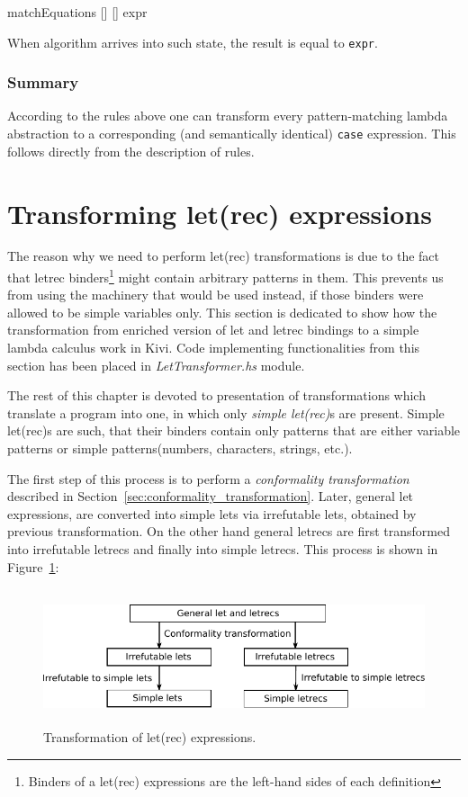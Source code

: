 \documentclass[12pt,a4paper]{report}
\begin{document}
\vspace*{0.2in}
\begin{code}[style=haskell]
matchEquations [] [] expr
\end{code}

When algorithm arrives into such state, the result is equal to \texttt{expr}.

\subsubsection{Summary}
According to the rules above one can transform every pattern-matching lambda
abstraction to a corresponding (and semantically identical) \texttt{case}
expression. This follows directly from the description of rules.

\section{Transforming let(rec) expressions}
\label{sec:letrec_transform}
The reason why we need to perform let(rec) transformations is due to the fact
that letrec binders\footnote{Binders of a let(rec) expressions are the
left-hand sides of each definition} might contain arbitrary patterns in them.
This prevents us from using the machinery that would be used instead, if those
binders were allowed to be simple variables only. This section is dedicated to
show how the transformation from enriched version of let and letrec bindings to
a simple lambda calculus work in Kivi. Code implementing functionalities from
this section has been placed in \textit{LetTransformer.hs} module.

The rest of this chapter is devoted to presentation of transformations which
translate a program into one, in which only \textit{simple let(rec)}s are
present. Simple let(rec)s are such, that their binders contain only patterns
that are either variable patterns or simple patterns(numbers, characters,
strings, etc.).

The first step of this process is to perform a \textit{conformality
transformation} described in Section~\ref{sec:conformality_transformation}.
Later, general let expressions, are converted into simple lets via irrefutable
lets, obtained by previous transformation. On the other hand general letrecs
are first transformed into irrefutable letrecs and finally into simple letrecs.
This process is shown in Figure~\ref{fig:letrec_transform}:

\begin{figure}[h!]
  \centering
  \includegraphics[height=4cm]{let_transform}
  \caption{Transformation of let(rec) expressions.}
  \label{fig:letrec_transform}
\end{figure}
\end{document}

